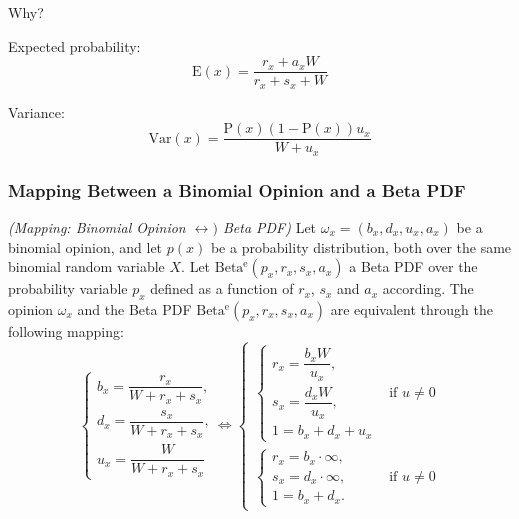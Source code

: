 \begin{question}
	Why?
\end{question}

Expected probability:
\begin{equation}\label{eq:beta_expected_probability}
	\mathrm{E}(x) = \frac{r_x + a_x W}{r_x + s_x + W}
\end{equation}

Variance:
\begin{equation}
	\mathrm{Var}(x) = \frac{\mathrm{P}(x)(1 - \mathrm{P}(x))u_x}{W + u_x}
\end{equation}

\subsubsection{Mapping Between a Binomial Opinion and a Beta PDF}

\begin{definition}
	\emph{(Mapping: Binomial Opinion $\leftrightarrow)$ Beta PDF)} Let $\omega_x = (b_x, d_x, u_x, a_x)$ be a binomial opinion, and let $p(x)$ be a probability distribution, both over the same binomial random variable $X$. Let $\mathrm{Beta^e}(p_x, r_x, s_x, a_x)$ a Beta PDF over the probability variable $p_x$ defined as a function of $r_x$, $s_x$ and
$a_x$ according. The opinion $\omega_x$ and the Beta PDF $\mathrm{Beta^e}(p_x, r_x, s_x, a_x)$ are
 equivalent through the following mapping:
	\begin{equation}
		\begin{cases}
			b_x = \dfrac{r_x}{W + r_x + s_x}\text{,}\\
			d_x = \dfrac{s_x}{W + r_x + s_x}\text{,}\\
			u_x = \dfrac{W}{W + r_x + s_x}
		\end{cases} \Leftrightarrow
		\begin{cases}
			\begin{cases}
				r_x = \dfrac{b_x W}{u_x}\text{,}\\
				s_x = \dfrac{d_x W}{u_x}\text{,}\\
				1 = b_x + d_x + u_x
			\end{cases} & \text{if } u \neq 0 \\
			\begin{cases}
				r_x = b_x \cdot \infty \text{,}\\
				s_x = d_x \cdot \infty \text{,}\\
				1 = b_x + d_x \text{.}
			\end{cases} & \text{if } u \neq 0
		\end{cases}
	\end{equation}
\end{definition}

